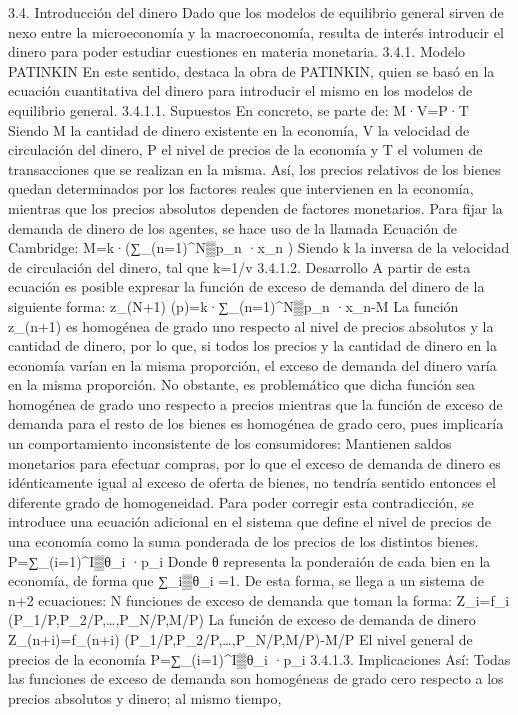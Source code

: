 \documentclass[10pt,a4paper]{article}
\begin{document}
3.4. Introducción del dinero
Dado que los modelos de equilibrio general sirven de nexo entre la microeconomía y la macroeconomía, resulta de interés introducir el dinero para poder estudiar cuestiones en materia monetaria. 
3.4.1. Modelo PATINKIN
En este sentido, destaca la obra de PATINKIN, quien se basó en la ecuación cuantitativa del dinero para introducir el mismo en los modelos de equilibrio general. 
3.4.1.1. Supuestos
En concreto, se parte de:
M·V=P·T
Siendo M la cantidad de dinero existente en la economía, V la velocidad de circulación del dinero, P el nivel de precios de la economía y T el volumen de transacciones que se realizan en la misma.
Así, los precios relativos de los bienes quedan determinados por los factores reales que intervienen en la economía, mientras que los precios absolutos dependen de factores monetarios. Para fijar la demanda de dinero de los agentes, se hace uso de la llamada Ecuación de Cambridge:
M=k·(∑_(n=1)^N▒p_n ·x_n )
Siendo k la inversa de la velocidad de circulación del dinero, tal que k=1/v
3.4.1.2. Desarrollo
A partir de esta ecuación es posible expresar la función de exceso de demanda del dinero de la siguiente forma:
z_(N+1) (p)=k·∑_(n=1)^N▒p_n ·x_n-M
La función z_(n+1) es homogénea de grado uno respecto al nivel de precios absolutos y la cantidad de dinero, por lo que, si todos los precios y la cantidad de dinero en la economía varían en la misma proporción, el exceso de demanda del dinero varía en la misma proporción.
No obstante, es problemático que dicha función sea homogénea de grado uno respecto a precios mientras que la función de exceso de demanda para el resto de los bienes es homogénea de grado cero, pues implicaría un comportamiento inconsistente de los consumidores:  Mantienen saldos monetarios para efectuar compras, por lo que el exceso de demanda de dinero es idénticamente igual al exceso de oferta de bienes, no tendría sentido entonces el diferente grado de homogeneidad. 
Para poder corregir esta contradicción, se introduce una ecuación adicional en el sistema que define el nivel de precios de una economía como la suma ponderada de los precios de los distintos bienes.
P=∑_(i=1)^I▒θ_i ·p_i
Donde θ representa la ponderaión de cada bien en la economía, de forma que ∑_i▒θ_i =1.
De esta forma, se llega a un sistema de n+2 ecuaciones:
	N funciones de exceso de demanda que toman la forma: Z_i=f_i (P_1/P,P_2/P,…,P_N/P,M/P)
	La función de exceso de demanda de dinero Z_(n+i)=f_(n+i) (P_1/P,P_2/P,…,P_N/P,M/P)-M/P  
	El nivel general de precios de la economía P=∑_(i=1)^I▒θ_i ·p_i
3.4.1.3. Implicaciones
Así:
	Todas las funciones de exceso de demanda son homogéneas de grado cero respecto a los precios absolutos y dinero;  al mismo tiempo, 
\end{document}
